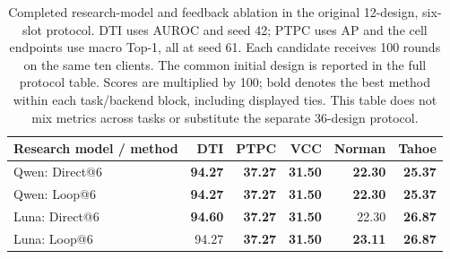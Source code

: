 \begin{table}[htbp]
\caption{Completed research-model and feedback ablation in the original 12-design, six-slot protocol. DTI uses AUROC and seed 42; PTPC uses AP and the cell endpoints use macro Top-1, all at seed 61. Each candidate receives 100 rounds on the same ten clients. The common initial design is reported in the full protocol table. Scores are multiplied by 100; bold denotes the best method within each task/backend block, including displayed ties. This table does not mix metrics across tasks or substitute the separate 36-design protocol.}
\label{tab:completed-short-summary}
\centering\small
\setlength{\tabcolsep}{4pt}
\begin{tabularx}{\linewidth}{@{}Xrrrrr@{}}
\toprule
Research model / method & DTI & PTPC & VCC & Norman & Tahoe \\
\midrule
Qwen: Direct@6 & \textbf{94.27} & \textbf{37.27} & \textbf{31.50} & \textbf{22.30} & \textbf{25.37} \\
Qwen: Loop@6 & \textbf{94.27} & \textbf{37.27} & \textbf{31.50} & \textbf{22.30} & \textbf{25.37} \\
\midrule
Luna: Direct@6 & \textbf{94.60} & \textbf{37.27} & \textbf{31.50} & 22.30 & \textbf{26.87} \\
Luna: Loop@6 & 94.27 & \textbf{37.27} & \textbf{31.50} & \textbf{23.11} & \textbf{26.87} \\
\bottomrule
\end{tabularx}
\end{table}
